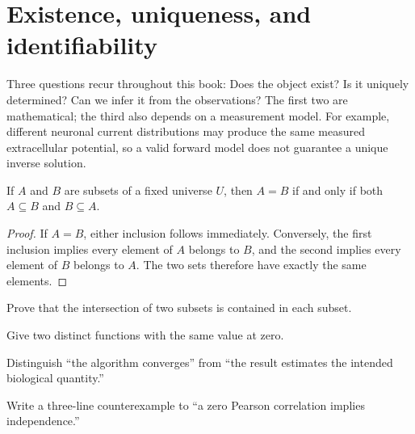 \section{Existence, uniqueness, and identifiability}
Three questions recur throughout this book: Does the object exist? Is it uniquely determined? Can we infer it from the observations? The first two are mathematical; the third also depends on a measurement model. For example, different neuronal current distributions may produce the same measured extracellular potential, so a valid forward model does not guarantee a unique inverse solution.

\begin{proposition}If $A$ and $B$ are subsets of a fixed universe $U$, then $A=B$ if and only if both $A\subseteq B$ and $B\subseteq A$.\end{proposition}
\begin{proof}If $A=B$, either inclusion follows immediately. Conversely, the first inclusion implies every element of $A$ belongs to $B$, and the second implies every element of $B$ belongs to $A$. The two sets therefore have exactly the same elements.\end{proof}
\begin{exercises}
\item Prove that the intersection of two subsets is contained in each subset.
\item Give two distinct functions with the same value at zero.
\item Distinguish ``the algorithm converges'' from ``the result estimates the intended biological quantity.''
\item Write a three-line counterexample to ``a zero Pearson correlation implies independence.''
\end{exercises}